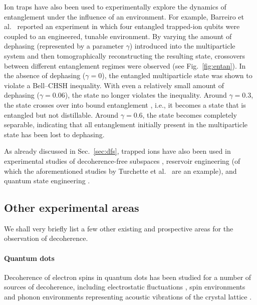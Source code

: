 \documentclass[3p,sort&compress,12pt]{elsarticle}
\begin{document}
Ion traps have also been used to experimentally explore the dynamics of entanglement under the influence of an environment. For example, Barreiro et al.\ \cite{Barreiro:2010:aa} reported an experiment in which four entangled trapped-ion qubits were coupled to an engineered, tunable environment. By varying the amount of dephasing (represented by a parameter $\gamma$) introduced into the multiparticle system and then tomographically reconstructing the resulting state, crossovers between different entanglement regimes were observed (see Fig.~\ref{fig:entan}). In the absence of dephasing ($\gamma=0$), the entangled multiparticle state was shown to violate a Bell--CHSH inequality. With even a relatively small amount of dephasing ($\gamma=0.06$), the state no longer violates the inequality. Around $\gamma=0.3$, the state crosses over into bound entanglement \cite{Horodecki:1998:oo}, i.e., it becomes a state that is entangled but not distillable. Around $\gamma=0.6$, the state becomes completely separable, indicating that all entanglement initially present in the multiparticle state has been lost to dephasing. 

As already discussed in Sec.~\ref{sec:dfs}, trapped ions have also been used in experimental studies of decoherence-free subspaces \cite{Kielpinski:2001:uu,Roos:204:pp,Haffner:2005:zz,Langer:2005:uu}, reservoir engineering \cite{Poyatos:1996:um,Myatt:2000:yy,Turchette:2000:aa,Carvalho:2001:ua} (of which the aforementioned studies by Turchette et al.\ \cite{Turchette:2000:aa} are an example), and quantum state engineering \cite{Barreiro:2011:oo,Lin:2013:pp,Kienzler:2015:oo}. 


\subsection{\label{sec:other}Other experimental areas}

We shall very briefly list a few other existing and prospective areas for the observation of decoherence.

\paragraph{Quantum dots} Decoherence of electron spins in quantum dots \cite{Hanson:2007:pp} has been studied for a number of sources of decoherence, including electrostatic fluctuations \cite{Kuhlmann:2013:aa,Arnold:2014:oo}, spin environments \cite{Fischer:2009:ii,Kuhlmann:2013:aa,Urbaszek:2013:pp,Delteil:2014:aa} and phonon environments representing acoustic vibrations of the crystal lattice \cite{Tighineanu:2018:ii}. 
\end{document}
